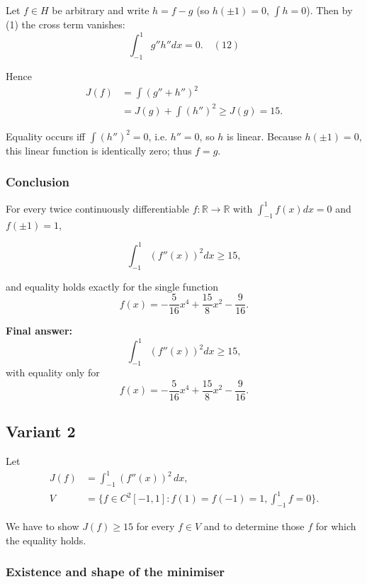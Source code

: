 \documentclass[12pt,a4paper]{article}
\theoremstyle{definition}
\begin{document}
        Let $f \in H$ be arbitrary and write $h = f - g$ (so $h(\pm 1) = 0$, $\int h = 0$).
        Then by (1) the cross term vanishes:
        $$\int_{-1}^{1} g'' h'' dx = 0. \quad {(12)}$$

        Hence
        \begin{align}
            J(f) &= \int (g'' + h'')^2 \\
            &= J(g) + \int (h'')^2 \geq J(g) = 15. \tag{13}
        \end{align}

        Equality occurs iff $\int(h'')^2 = 0$, i.e. $h'' = 0$, so $h$ is linear.
        Because $h(\pm 1) = 0$, this linear function is identically zero; thus $f = g$.

        \subsubsection*{Conclusion}

        For every twice continuously differentiable $f : \mathbb{R} \to \mathbb{R}$ with $\int_{-1}^{1}f(x)dx = 0$ and $f(\pm 1) = 1$,

        $$\int_{-1}^{1} (f''(x))^2 dx \geq 15,$$

        and equality holds exactly for the single function
        $$f(x) = -\frac{5}{16}x^4 + \frac{15}{8}x^2 - \frac{9}{16}.$$

        \textbf{Final answer:}
        $$\int_{-1}^{1}(f''(x))^2dx \geq 15,$$
        with equality only for
        $$f(x) = -\frac{5}{16}x^4 + \frac{15}{8}x^2 - \frac{9}{16}.$$

        \subsection{Variant 2}
        Let
        \begin{align}
            J(f) &= \int_{-1}^{1} (f''(x))^2 \, dx, \\
            V &= \{f \in C^2[-1,1] : f(1) = f(-1) = 1, \int_{-1}^{1} f = 0\}.
        \end{align}

        We have to show $J(f) \geq 15$ for every $f \in V$ and to determine those $f$ for which the equality holds.

        \subsubsection*{Existence and shape of the minimiser}
\end{document}
